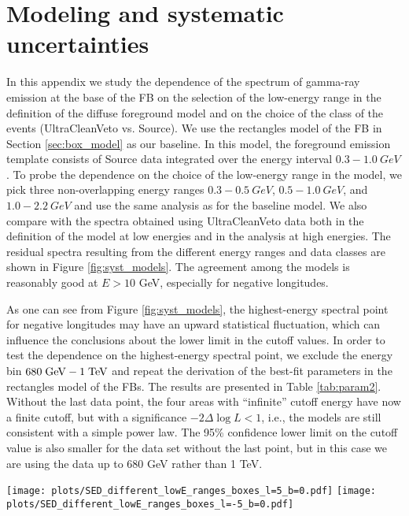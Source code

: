 \section{Modeling and systematic uncertainties}

In this appendix we study the dependence of the spectrum of gamma-ray emission at the base of the FB
on the selection of the low-energy range in the definition of the diffuse foreground model
and on the choice of the class of the events (UltraCleanVeto vs. Source).
We use the rectangles model of the FB in Section \ref{sec:box_model}
as our baseline.
In this model, the foreground emission template consists of Source data integrated over the energy interval $0.3 - \SI{1.0}{GeV}$. 
To probe the dependence on the choice of the low-energy range in the model, 
we pick three non-overlapping energy ranges $0.3 - \SI{0.5}{GeV}$, $0.5 - \SI{1.0}{GeV}$, and $1.0 - \SI{2.2}{GeV}$ 
and use the same analysis as for the baseline model. 
We also compare with the spectra obtained using UltraCleanVeto data both in the definition of the model
at low energies and in the analysis at high energies.
The residual spectra resulting from the different energy ranges and data classes are shown in Figure \ref{fig:syst_models}. 
The agreement among the models is reasonably good at $E > 10$ GeV, especially for negative longitudes.

As one can see from Figure \ref{fig:syst_models}, 
the highest-energy spectral point for negative longitudes may have an upward statistical fluctuation,
which can influence the conclusions about the lower limit in the cutoff values.
In order to test the dependence on the highest-energy spectral point, we exclude the energy bin $680\;{\rm GeV} - 1\;{\rm TeV}$ and 
repeat the derivation of the best-fit parameters in the rectangles model of the FBs.
The results are presented in Table \ref{tab:param2}.
Without the last data point, the four areas with ``infinite'' cutoff energy have now a finite cutoff,
but with a significance $-2\Delta \log L  < 1$, i.e., the models are still consistent with a simple power law.
The 95\% confidence lower limit on the cutoff value is also smaller for the data set without the last point,
but in this case we are using the data up to 680 GeV rather than 1 TeV.

\begin{figure*}[h]
\texttt{[image: plots/SED\_different\_lowE\_ranges\_boxes\_l=5\_b=0.pdf]}
\texttt{[image: plots/SED\_different\_lowE\_ranges\_boxes\_l=-5\_b=0.pdf]}
\caption{SED of the residual in the rectangles model using Source class (dotted lines with markers) and UltraCleanVeto class data (solid lines) 
in four different energy ranges used to determine the foreground diffuse emission template. 
The baseline model, presented in Section \ref{sec:box_model}, has the low-energy range in the definition of the foreground model
$0.3 - \SI{1.0}{GeV}$ (black squres).}
\label{fig:syst_models}
\end{figure*}

